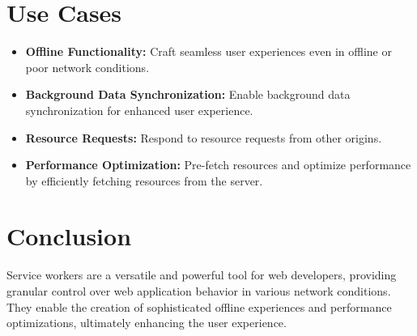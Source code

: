 \documentclass{article}
\begin{document}
\section*{\color{darkblue}\Large Use Cases}

\begin{itemize}[label=$\bullet$, leftmargin=*]
    \item \textbf{Offline Functionality:} Craft seamless user experiences even in offline or poor network conditions.
    \item \textbf{Background Data Synchronization:} Enable background data synchronization for enhanced user experience.
    \item \textbf{Resource Requests:} Respond to resource requests from other origins.
    \item \textbf{Performance Optimization:} Pre-fetch resources and optimize performance by efficiently fetching resources from the server.
\end{itemize}

\citep{Medium}
\section*{\color{darkblue}\Large Conclusion}

Service workers are a versatile and powerful tool for web developers, providing granular control over web application behavior in various network conditions. They enable the creation of sophisticated offline experiences and performance optimizations, ultimately enhancing the user experience.



\end{document}
